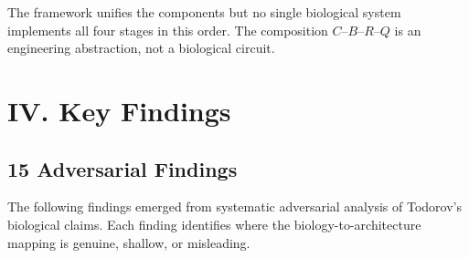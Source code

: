 \documentclass[11pt,a4paper]{article}
\begin{document}
The framework unifies the components but no single biological system implements all four stages in this order. The composition $C$--$B$--$R$--$Q$ is an engineering abstraction, not a biological circuit.

\newpage


\section{IV. Key Findings}

\subsection{15 Adversarial Findings}

The following findings emerged from systematic adversarial analysis of Todorov's biological claims. Each finding identifies where the biology-to-architecture mapping is genuine, shallow, or misleading.
\end{document}
